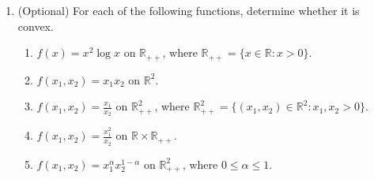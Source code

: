 \newcommand{\school}{\text{University of Science and Technology of China}}
\newcommand{\course}{\text{Introduction to Machine Learning}}
\newcommand{\semester}{\text{Fall 2022}}
\newcommand{\lecturer}{\text{Jie Wang}}
\newcommand{\posted}{\text{Nov. 3, 2022}}
\newcommand{\due}{\text{Nov. 15, 2022}}
\newcommand{\hwno}{\text{4}}
\newcommand{\name}{\text{Yunqin Zhu}}
\newcommand{\id}{\text{PB20061372}}


\maketitle

\begin{exercise}
  \begin{enumerate}
    \item (Optional)
      For each of the following functions, determine whether it is convex. %
      \begin{enumerate}
        \item
          $f(x)=x^2\log x$ on $\mathbb{R}_{++}$, where $\mathbb{R}_{++}=\{x\in\mathbb{R}:x>0\}$.
        \item
          $f(x_1,x_2)=x_1x_2$ on $\mathbb{R}^2$.
        \item
          $f(x_1,x_2)=\frac{x_1}{x_2}$ on $\mathbb{R}^2_{++}$, where $\mathbb{R}^2_{++}=\{ (x_1,x_2)\in\mathbb{R}^2:x_1,x_2>0\}$.
        \item
          $f(x_1,x_2)=\frac{x_1^2}{x_2}$ on $\mathbb{R}\times\mathbb{R}_{++}$.
        \item
          $f(x_1,x_2)=x_1^\alpha x_2^{1-\alpha}$ on $\mathbb{R}^2_{++}$, where $0\le\alpha\le 1$.
      \end{enumerate}
      

\end{enumerate}
\end{exercise}
